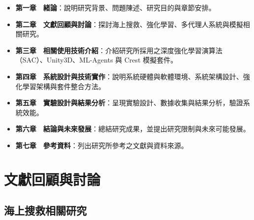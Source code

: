 \documentclass[12pt,a4paper]{ctexart}
\begin{document}
\begin{itemize}
\item \textbf{第一章　緒論}：說明研究背景、問題陳述、研究目的與章節安排。
\item \textbf{第二章　文獻回顧與討論}：探討海上搜救、強化學習、多代理人系統與模擬相關研究。
\item \textbf{第三章　相關使用技術介紹}：介紹研究所採用之深度強化學習演算法（SAC）、Unity3D、ML-Agents 與 Crest 模擬套件。
\item \textbf{第四章　系統設計與技術實作}：說明系統硬體與軟體環境、系統架構設計、強化學習架構與套件整合方法。
\item \textbf{第五章　實驗設計與結果分析}：呈現實驗設計、數據收集與結果分析，驗證系統效能。
\item \textbf{第六章　結論與未來發展}：總結研究成果，並提出研究限制與未來可能發展。
\item \textbf{第七章　參考資料}：列出研究所參考之文獻與資料來源。
\end{itemize}

\newpage

\section{文獻回顧與討論}

\subsection{海上搜救相關研究}
\end{document}
